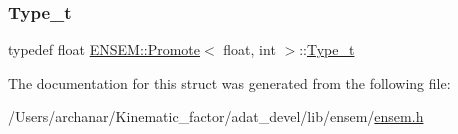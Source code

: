 \subsubsection{\texorpdfstring{Type\_t}{Type\_t}\hspace{0.1cm}{\footnotesize\ttfamily [2/2]}}
{\footnotesize\ttfamily typedef float \mbox{\hyperlink{structENSEM_1_1Promote}{E\+N\+S\+E\+M\+::\+Promote}}$<$ float, int $>$\+::\mbox{\hyperlink{structENSEM_1_1Promote_3_01float_00_01int_01_4_ac183cf99d20cafab1e283ee7435667af}{Type\+\_\+t}}}



The documentation for this struct was generated from the following file\+:\begin{DoxyCompactItemize}
\item 
/\+Users/archanar/\+Kinematic\+\_\+factor/adat\+\_\+devel/lib/ensem/\mbox{\hyperlink{lib_2ensem_2ensem_8h}{ensem.\+h}}\end{DoxyCompactItemize}
